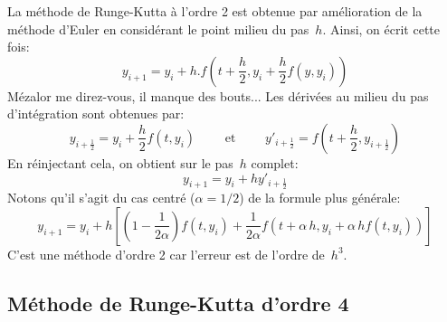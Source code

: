 La méthode de Runge-Kutta à l'ordre 2 est obtenue par amélioration de la méthode d'Euler en considérant le point milieu du pas~$h$. Ainsi, on écrit cette fois:
\begin{equation}
y_{i+1}=y_i+h.f\left(t+\frac{h}2,y_i+\frac{h}2f(y,y_i)\right)
\end{equation}
Mézalor me direz-vous, il manque des bouts... Les dérivées au milieu du pas d'intégration sont obtenues par:
\begin{equation}
y_{i+\frac{1}{2}} = y_i + \frac{h}{2} f \left( t, y_i \right) \qquad \text{ et } \qquad y'_{i+\frac{1}{2}} = f \left( t + \frac{h}{2}, y_{i+\frac{1}{2}} \right)
\end{equation}
En réinjectant cela, on obtient sur le pas~$h$ complet:
\begin{equation}
y_{i+1} = y_i + h y'_{i+\frac{1}{2}}
\end{equation}
Notons qu'il s'agit du cas centré ($\alpha=1/2$) de la formule plus générale:
\begin{equation}
y_{i+1} = y_i + h\left[\left(1-\frac1{2\alpha}\right)f \left( t, y_i \right) + \frac1{2\alpha}f \left( t + \alpha\,h, y_i + \alpha\,h f \left( t, y_i \right) \right)\right]
\end{equation}
C'est une méthode d'ordre 2 car l'erreur est de l'ordre de~$h^3$. 

\medskip
\subsection{Méthode de Runge-Kutta d'ordre 4} 

